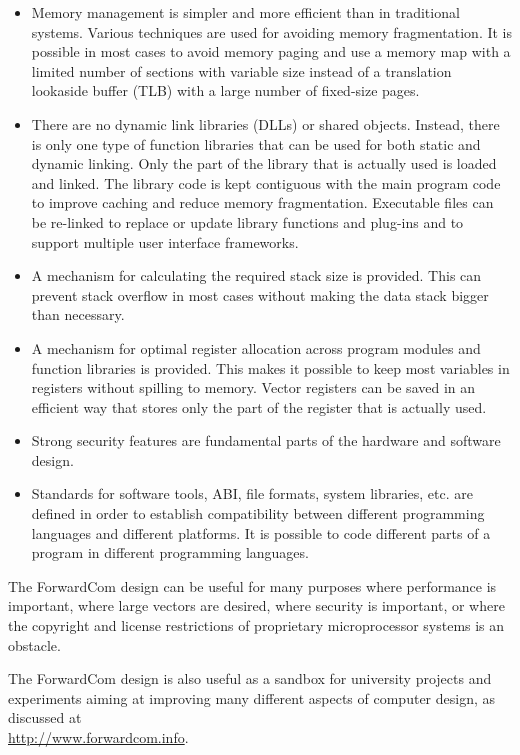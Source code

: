 \documentclass[forwardcom.tex]{subfiles}
\begin{document}
\begin{itemize}
\item Memory management is simpler and more efficient than in traditional systems. Various techniques are used for avoiding memory fragmentation. 
It is possible in most cases to avoid memory paging and use a memory map with a limited number of sections with variable size instead of a translation lookaside buffer (TLB) with a large number of fixed-size pages.

\item There are no dynamic link libraries (DLLs) or shared objects. Instead, there is only one type of function libraries 
that can be used for both static and dynamic linking. Only the part of the library that is actually used is loaded and linked. The library code is kept contiguous with the main program code to improve caching and reduce memory fragmentation. 
Executable files can be re-linked to replace or update library functions and plug-ins and to support multiple user interface frameworks.

\item A mechanism for calculating the required stack size is provided. This can prevent stack overflow in most cases without making the data stack bigger than necessary.

\item A mechanism for optimal register allocation across program modules and function libraries is provided. This makes it possible to keep most variables in registers without spilling to memory. Vector registers can be saved in an efficient way that stores only the part of the register that is actually used.

\item Strong security features are fundamental parts of the hardware and software design.

\item Standards for software tools, ABI, file formats, system libraries, etc. are defined in order to establish compatibility between different programming languages and different platforms. It is possible to code different parts of a program in different programming languages.

\end{itemize}
\vv

The ForwardCom design can be useful for many purposes where performance is important, where large vectors are desired, where security is important, or where the copyright and license restrictions of proprietary microprocessor systems is an obstacle. 

\vv
The ForwardCom design is also useful as a sandbox for university projects and experiments aiming at improving many different aspects of computer design, as discussed at \\
\href{http://www.forwardcom.info}{http://www.forwardcom.info}.
\end{document}
